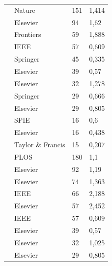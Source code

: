 \documentclass[preprint,12pt,authoryear]{elsarticle}
\begin{document}
\begin{longtable}{p{6.5cm}p{3.5cm}p{0.3cm}p{0.5cm}}
        \citet{GUO2019}               & Nature                  & 151 & 1,414 \\
            \citet{VO2019}                & Elsevier                & 94  & 1,62  \\
            \citet{XIE2019}               & Frontiers               & 59  & 1,888 \\
            \citet{LI2019}                & IEEE                    & 57  & 0,609 \\
            \citet{MURTAZA2019}           & Springer                & 45  & 0,335 \\
            \citet{DAS2019}               & Elsevier                & 39  & 0,57  \\
            \citet{MITTAL2019}            & Elsevier                & 32  & 1,278 \\
            \citet{ALOM2019}              & Springer                & 29  & 0,666 \\
            \citet{ROY2019}               & Elsevier                & 29  & 0,805 \\
            \citet{GHAZVINIANZANJANI2019} & SPIE                    & 16  & 0,6   \\
            \citet{SABEENABEEVI2019}      & Elsevier                & 16  & 0,438 \\
            \citet{ALQUDAH2019}           & Taylor \& Francis       & 15  & 0,207 \\
            \citet{CRUZROA2018}           & PLOS                    & 180 & 1,1   \\
            \citet{OLIVEIRA2018}          & Elsevier                & 92  & 1,19  \\
            \citet{GECER2018}             & Elsevier                & 74  & 1,363 \\
            \citet{ZHENG2018}             & IEEE                    & 66  & 2,188 \\
            \citet{LI2018}                & Elsevier                & 57  & 2,452 \\
            \citet{BARDOU2018}            & IEEE                    & 57  & 0,609 \\
            \citet{FONDON2018}            & Elsevier                & 39  & 0,57  \\
            \citet{GANDOMKAR2018a}        & Elsevier                & 32  & 1,025 \\
            \citet{SAHA2018a}             & Elsevier                & 29  & 0,805 \\

\end{longtable}
\end{document}
